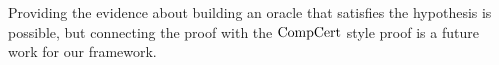 Providing the evidence about building an oracle that satisfies the hypothesis is possible, 
but connecting the proof with the $\mathrm{CompCert}$ style proof is a future work for our framework. 

%
